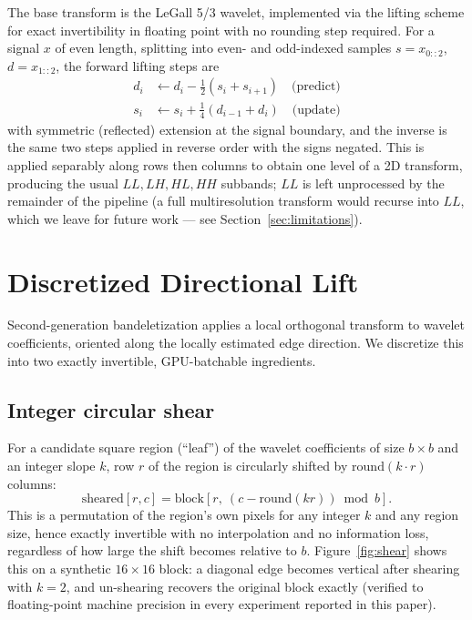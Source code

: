 \documentclass[11pt]{article}
\begin{document}
The base transform is the LeGall 5/3 wavelet, implemented via the lifting
scheme \citep{sweldens1998lifting} for exact invertibility in floating point
with no rounding step required. For a signal $x$ of even length, splitting
into even- and odd-indexed samples $s = x_{0::2}$, $d = x_{1::2}$, the
forward lifting steps are
\begin{align}
d_i &\leftarrow d_i - \tfrac{1}{2}\left(s_i + s_{i+1}\right) \quad \text{(predict)} \\
s_i &\leftarrow s_i + \tfrac{1}{4}\left(d_{i-1} + d_i\right) \quad \text{(update)}
\end{align}
with symmetric (reflected) extension at the signal boundary, and the inverse
is the same two steps applied in reverse order with the signs negated. This
is applied separably along rows then columns to obtain one level of a 2D
transform, producing the usual $LL, LH, HL, HH$ subbands; $LL$ is left
unprocessed by the remainder of the pipeline (a full multiresolution
transform would recurse into $LL$, which we leave for future work --- see
Section~\ref{sec:limitations}).

\section{Discretized Directional Lift}
\label{sec:shear}

Second-generation bandeletization applies a local orthogonal transform to
wavelet coefficients, oriented along the locally estimated edge direction. We
discretize this into two exactly invertible, GPU-batchable ingredients.

\subsection{Integer circular shear}

For a candidate square region (``leaf'') of the wavelet coefficients of size
$b \times b$ and an integer slope $k$, row $r$ of the region is circularly
shifted by $\mathrm{round}(k \cdot r)$ columns:
\begin{equation}
\text{sheared}[r, c] = \text{block}\left[r,\ (c - \mathrm{round}(kr)) \bmod b\right].
\end{equation}
This is a permutation of the region's own pixels for any integer $k$ and any
region size, hence exactly invertible with no interpolation and no
information loss, regardless of how large the shift becomes relative to $b$.
Figure~\ref{fig:shear} shows this on a synthetic $16\times16$ block: a
diagonal edge becomes vertical after shearing with $k=2$, and un-shearing
recovers the original block exactly (verified to floating-point machine
precision in every experiment reported in this paper).
\end{document}
